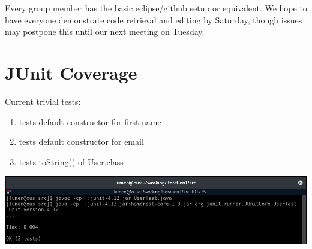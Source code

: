 \documentclass[paper=a4, fontsize=11pt]{scrartcl} %
\numberwithin{equation}{section} %
\numberwithin{figure}{section} %
\numberwithin{table}{section} %
\begin{document}
\clearpage

Every group member has the basic eclipse/github setup or equivalent.  We hope to have 
everyone demonstrate code retrieval and editing by Saturday, though issues may postpone 
this until our next meeting on Tuesday.

\section{JUnit Coverage}

Current trivial tests:

\begin{enumerate}
\item tests default constructor for first name
\item tests default constructor for email
\item tests toString() of User.class
\end{enumerate}

\begin{center}
\includegraphics[scale=0.45]{junit.png}
\end{center}
\end{document}
